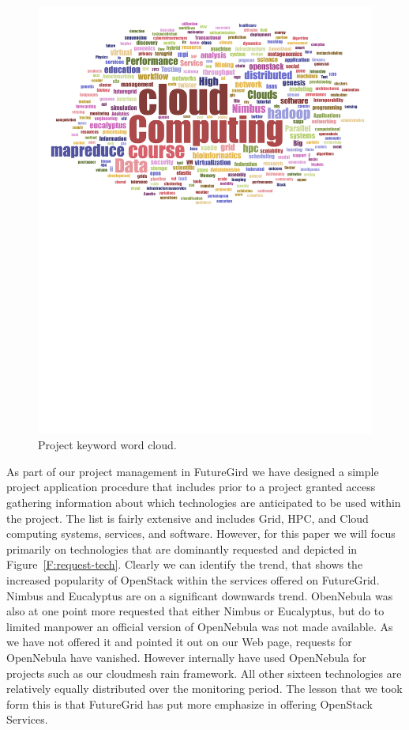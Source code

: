 \documentclass{article}
\begin{document}
\begin{figure}[p]
\begin{minipage}[t]{1.0\textwidth}
  \centering
    \includegraphics[width=1.0\textwidth]{images/fg-keyword-wordcloud.pdf}
  \caption{Project keyword word cloud.}\label{F:keycloud}
\end{minipage}
\end{figure}


As part of our project management in FutureGird we have designed a
simple project application procedure that includes prior to a project
granted access gathering information about which technologies are
anticipated to be used within the project. The list is fairly
extensive and includes Grid, HPC, and Cloud computing systems,
services, and software. However, for this paper we will focus
primarily on technologies that are dominantly requested and depicted
in Figure~\ref{F:request-tech}. Clearly we can identify the trend,
that shows the increased popularity of OpenStack within the services
offered on FutureGrid. Nimbus and Eucalyptus are on a significant
downwards trend. ObenNebula was also at one point more requested that
either Nimbus or Eucalyptus, but do to limited manpower an official
version of OpenNebula was not made available. As we have not offered
it and pointed it out on our Web page, requests for OpenNebula have vanished.
However internally have used OpenNebula for projects such as our cloudmesh rain
framework. All other sixteen technologies are relatively equally
distributed over the monitoring period. The lesson that we took form
this is that FutureGrid has put more emphasize in offering OpenStack Services.
\end{document}

